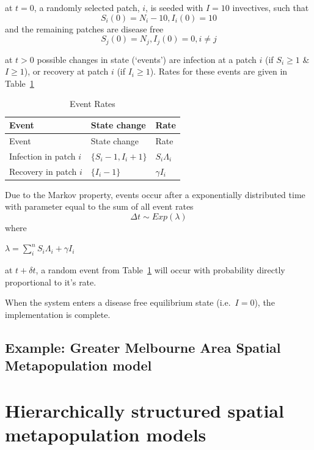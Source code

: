 \documentclass{monashthesis}
\begin{document}
at \(t = 0\), a randomly selected patch, \(i\), is seeded with
\(I = 10\) invectives, such that
\[S_{i}(0) = N_{i} - 10, I_{i}(0) = 10\] and the remaining patches are
disease free \[S_j(0) = N_j, I_j(0) =0, i\neq j \]

at \(t>0\) possible changes in state (`events') are infection at a patch
\(i\) (if \(S_i \geq 1\) \& \(I \geq 1\)), or recovery at patch \(i\)
(if \(I_i \geq 1\)). Rates for these events are given in
Table~\ref{tbl-EventRates}

\hypertarget{tbl-EventRates}{}
\begin{longtable}[]{@{}lll@{}}
\caption{\label{tbl-EventRates}Event Rates}\tabularnewline
\toprule\noalign{}
Event & State change & Rate \\
\midrule\noalign{}
\endfirsthead
\toprule\noalign{}
Event & State change & Rate \\
\midrule\noalign{}
\endhead
\bottomrule\noalign{}
\endlastfoot
Infection in patch \(i\) & \(\{S_i -1, I_i +1\}\) & \(S_i \Lambda_i\) \\
Recovery in patch \(i\) & \(\{I_i - 1\}\) & \(\gamma I_i\) \\
\end{longtable}

Due to the Markov property, events occur after a exponentially
distributed time with parameter equal to the sum of all event rates
\[\Delta t \sim Exp(\lambda)\] where

\(\lambda = \sum\limits_{i}^{n}S_i \Lambda_i + \gamma I_i\)

at \(t + \delta t\), a random event from Table~\ref{tbl-EventRates} will
occur with probability directly proportional to it's rate.

When the system enters a disease free equilibrium state
(i.e.~\(I = 0\)), the implementation is complete.

\hypertarget{sec-MossGmelb}{%
\section{Example: Greater Melbourne Area Spatial Metapopulation
model}\label{sec-MossGmelb}}


\hypertarget{sec-intro}{%
\chapter{Hierarchically structured spatial metapopulation
models}\label{sec-intro}}
\end{document}
